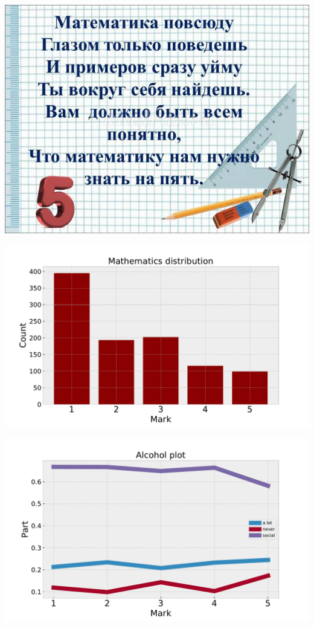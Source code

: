 \documentclass[russian, 10pt]{beamer}
\begin{document}
\begin{frame}

\centering
\includegraphics[scale=0.5]{images/pyaterka.jpg}

\end{frame}

\begin{frame}

\centering
\includegraphics[scale=0.45]{images/9.pdf}

\end{frame}



\begin{frame}

\centering
\includegraphics[scale=0.45]{images/10.pdf}

\end{frame}
\end{document}
